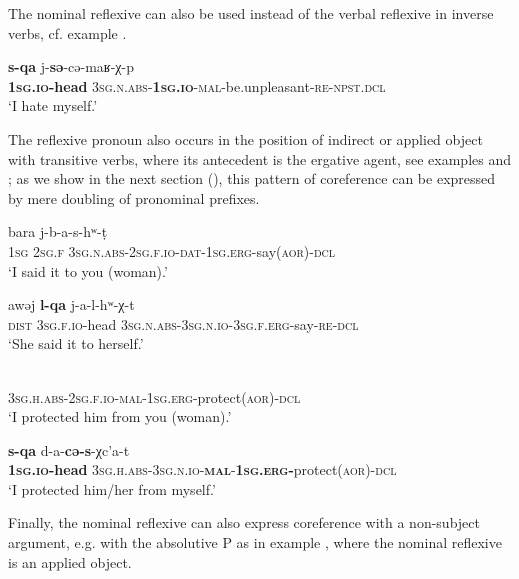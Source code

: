 \documentclass[output=paper]{langscibook}
\begin{document}
The nominal reflexive can also be used instead of the verbal reflexive in inverse verbs, cf. example .

\ea 
    \label{ex:Arkadiev:32}
    \gll \textbf{{s-qa}}  {j-}\textbf{{s{ə}}}{{}-c{ə}-ma{ʁ}-χ-p}\\
   \textbf{\textsc{1sg.io}}\textbf{{}-head}  \textsc{3sg.n.abs-}\textbf{\textsc{1sg.io}}\textsc{{}-mal}{}-be.unpleasant-\textsc{re-npst.dcl}\\
    \glt ‘I hate myself.’
\z


The reflexive pronoun also occurs in the position of indirect or applied object with transitive verbs, where its antecedent is the ergative agent, see examples  and ; as we show in the next section (), this pattern of coreference can be expressed by mere doubling of pronominal prefixes.

\ea 
\label{ex:Arkadiev:33}
    \ea 
    \label{ex:Arkadiev:33a}
      {bara}  {j-b-a-s-h{ʷ}-t{̣}}\\
      \textsc{1sg}  \textsc{2sg.f}  \textsc{3sg.n.abs-2sg.f.io-dat-1sg.erg}{}-say(\textsc{aor)-dcl}\\
    \glt ‘I said it to you (woman).’
    
    \ex 
    \label{ex:Arkadiev:33b}
    \gll aw{ə}j \textbf{{l-qa}}  j-a-l-h{ʷ}-χ-t\\
    \textsc{dist} \textsc{3sg.f.io}{}-head  \textsc{3sg.n.abs-3sg.n.io-3sg.f.erg}{}-say-\textsc{re-dcl}\\
    \glt ‘She said it to herself.’
\z
\z

\ea 
\label{ex:Arkadiev:34}
    \ea 
    \label{ex:Arkadiev:34a}
    \\
      \textsc{3sg.h.abs-2sg.f.io-mal-1sg.erg}{}-protect\textsc{(aor)-dcl}\\
    \glt ‘I protected him from you (woman).’
    
    \ex 
    \label{ex:Arkadiev:34b}
    \gll \textbf{s-qa}  d-a-\textbf{c{ə}-s}-χc’a-t\\
   \textbf{\textsc{1sg.io}}\textbf{{}-head} \textsc{3sg.h.abs-3sg.n.io-}\textbf{\textsc{mal}}\textsc{{}-}\textbf{\textsc{1sg.erg-}}protect(\textsc{aor)-dcl}\\
    \glt ‘I protected him/her from myself.’
\z
\z

Finally, the nominal reflexive can also express coreference with a non-subject argument, e.g. with the absolutive P as in example , where the nominal reflexive is an applied object.
\end{document}
